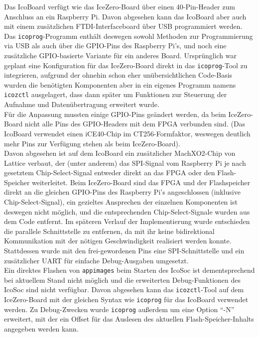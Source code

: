 {Das IcoBoard verfügt wie das IceZero-Board über einen 40-Pin-Header zum Anschluss an ein Raspberry Pi. Davon abgesehen kann das IcoBoard aber auch mit einem zusätzlichen FTDI-Interfaceboard über USB programmiert werden. Das {\tt icoprog}-Programm enthält deswegen sowohl Methoden zur Programmierung via USB als auch über die GPIO-Pins des Raspberry Pi's, und noch eine zusätzliche GPIO-basierte Variante für ein anderes Board. Ursprünglich war geplant eine Konfiguration für das IceZero-Board direkt in das {\tt icoprog}-Tool zu integrieren, aufgrund der ohnehin schon eher unübersichtlichen Code-Basis wurden die benötigten Komponenten aber in ein eigenes Programm namens {\tt icozctl} ausgelagert, dass dann später um Funktionen zur Steuerung der Aufnahme und Datenübertragung erweitert wurde.\\ 
Für die Anpassung mussten einige GPIO-Pins geändert werden, da beim IceZero-Board nicht alle Pins des GPIO-Headers mit dem FPGA verbunden sind. (Das IcoBoard verwendet einen iCE40-Chip im CT256-Formfaktor, weswegen deutlich mehr Pins zur Verfügung stehen als beim IceZero-Board\cite{web:trenz_icoboard}).\\
Davon abgesehen ist auf dem IcoBoard ein zusätzlicher MachXO2-Chip von Lattice verbaut, der (unter anderem) das SPI-Signal vom Raspberry Pi je nach gesetztem Chip-Select-Signal entweder direkt an das FPGA oder den Flash-Speicher weiterleitet. Beim IceZero-Board sind das FPGA und der Flashspeicher direkt an die gleichen GPIO-Pins des Raspberry Pi's angeschlossen (inklusive Chip-Select-Signal), ein gezieltes Ansprechen der einzelnen Komponenten ist deswegen nicht möglich, und die entsprechenden Chip-Select-Signale wurden aus dem Code entfernt. 
Im späteren Verlauf der Implementierung wurde entschieden die parallele Schnittstelle zu entfernen, da mit ihr keine bidirektional Kommunikation mit der nötigen Geschwindigkeit realisiert werden konnte. Stattdessen wurde mit den frei-gewordenen Pins eine SPI-Schnittstelle und ein zusätzlicher UART für einfache Debug-Ausgaben umgesetzt.\\
Ein direktes Flashen von {\tt appimages} beim Starten des IcoSoc ist dementsprechend bei aktuellem Stand nicht möglich und die erweiterten Debug-Funktionen des IcoSoc sind nicht verfügbar. 
Davon abgesehen kann das {\tt icozctl}-Tool auf dem IceZero-Board mit der gleichen Syntax wie {\tt icoprog} für das IcoBoard verwendet werden.
Zu Debug-Zwecken wurde {\tt icoprog} außerdem um eine Option ``-N'' erweitert, mit der ein Offset für das Auslesen des aktuellen Flash-Speicher-Inhalts angegeben werden kann.

}
